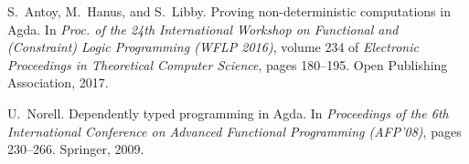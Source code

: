 \documentclass[11pt,fleqn]{article}
\begin{document}
\sloppy




\begin{thebibliography}{10}

S.~Antoy, M.~Hanus, and S.~Libby.
\newblock Proving non-deterministic computations in {Agda}.
\newblock In {\em Proc. of the 24th International Workshop on Functional and
  (Constraint) Logic Programming (WFLP 2016)}, volume 234 of {\em Electronic
  Proceedings in Theoretical Computer Science}, pages 180--195. Open Publishing
  Association, 2017.

U.~Norell.
\newblock Dependently typed programming in {Agda}.
\newblock In {\em Proceedings of the 6th International Conference on Advanced
  Functional Programming (AFP'08)}, pages 230--266. Springer, 2009.

\end{thebibliography}
\end{document}
